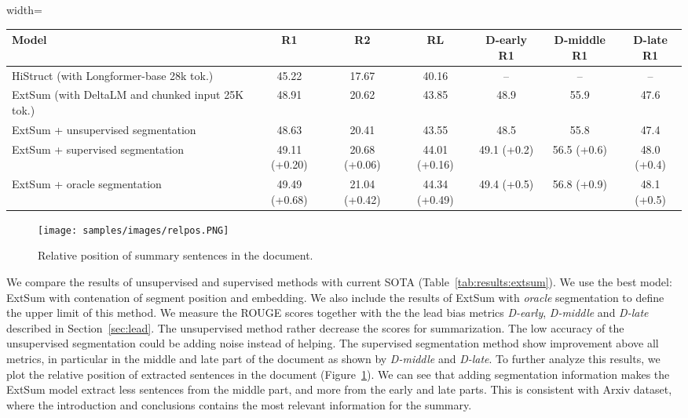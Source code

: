 \documentclass[sigconf]{acmart}
\begin{document}
\begin{table*}
	\centering
	\begin{adjustbox}{width=\linewidth}
	\begin{tabular}{l c c c | c c c} 
		\toprule
		\textbf{Model} & \textbf{R1} &  \textbf{R2} &  \textbf{RL} & \textbf{D-early R1}  & \textbf{D-middle R1} & \textbf{D-late R1} \\ \hline	
		HiStruct (with Longformer-base 28k tok.) \cite{ruan-etal-2022-histruct} & 45.22 & 17.67 & 40.16 & -- & -- & -- \\ \hline
        ExtSum (with DeltaLM and chunked input 25K tok.) &	48.91	&20.62 &43.85 & 48.9&	55.9&	47.6\\
        ExtSum + unsupervised segmentation	& 48.63&	20.41&	43.55 & 48.5 & 55.8 & 47.4 \\
        ExtSum + supervised segmentation	&49.11 (+0.20)	&20.68 (+0.06)	&44.01 (+0.16)    &49.1 (+0.2)	&56.5 (+0.6)	&48.0 (+0.4) \\
        ExtSum + oracle segmentation	&49.49 (+0.68)	&21.04 (+0.42)	&44.34 (+0.49)   &49.4 (+0.5)	&56.8 (+0.9)	&48.1 (+0.5) \\
		\bottomrule
	\end{tabular} 
	\end{adjustbox}
	\caption{Evaluation results of using text segmentation in extractive summarization on Arxiv test-set}
	\label{tab:results:extsum}
\end{table*}

\begin{figure}
  \centering
  \texttt{[image: samples/images/relpos.PNG]}
  \caption{ Relative position of summary sentences in the document.}
  \label{fig:relpos} 
\end{figure}

We compare the results of unsupervised and supervised methods with current SOTA  \cite{ruan-etal-2022-histruct} (Table~\ref{tab:results:extsum}). We use the best model: ExtSum with contenation of segment position and embedding. We also include the results of ExtSum with \emph{oracle} segmentation to define the upper limit of this method. We measure the ROUGE scores  together with the the lead bias metrics \emph{D-early}, \emph{D-middle} and \emph{D-late} described in Section~\ref{sec:lead}. The unsupervised method rather decrease the scores for summarization. The low accuracy of the unsupervised segmentation could be adding noise instead of helping.  The supervised segmentation method show improvement above all metrics, in particular in the middle and late part of the document as shown by \emph{D-middle} and \emph{D-late}. To further analyze this results, we plot the relative position of extracted sentences in the document (Figure~\ref{fig:relpos}). We can see that adding segmentation information makes the ExtSum model extract less sentences from the middle part, and more from the early and late parts. This is consistent with Arxiv dataset, where the introduction and conclusions contains the most relevant information for the summary.
\end{document}
